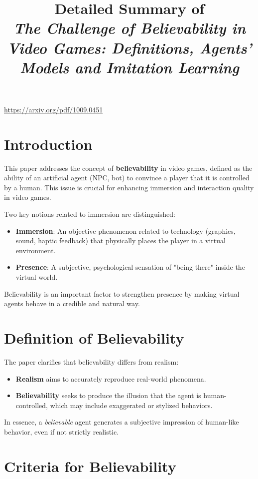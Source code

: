 \documentclass[a4paper,11pt]{article}
\title{Detailed Summary of \\ 
\textit{The Challenge of Believability in Video Games: Definitions, Agents’ Models and Imitation Learning}}
\author{}
\date{}
\begin{document}
\maketitle

\url{https://arxiv.org/pdf/1009.0451}

\section{Introduction}

This paper addresses the concept of \textbf{believability} in video games, defined as the ability of an artificial agent (NPC, bot) to convince a player that it is controlled by a human. This issue is crucial for enhancing immersion and interaction quality in video games.

Two key notions related to immersion are distinguished:

\begin{itemize}
    \item \textbf{Immersion}: An objective phenomenon related to technology (graphics, sound, haptic feedback) that physically places the player in a virtual environment.
    \item \textbf{Presence}: A subjective, psychological sensation of "being there" inside the virtual world.
\end{itemize}

Believability is an important factor to strengthen presence by making virtual agents behave in a credible and natural way.

\section{Definition of Believability}

The paper clarifies that believability differs from realism:

\begin{itemize}
    \item \textbf{Realism} aims to accurately reproduce real-world phenomena.
    \item \textbf{Believability} seeks to produce the illusion that the agent is human-controlled, which may include exaggerated or stylized behaviors.
\end{itemize}

In essence, a \textit{believable} agent generates a subjective impression of human-like behavior, even if not strictly realistic.

\section{Criteria for Believability}
\end{document}
